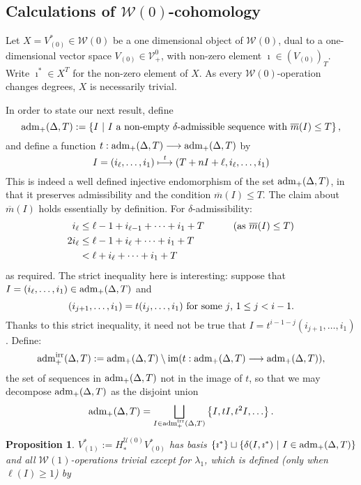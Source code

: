 \documentclass[11pt]{amsart}
\theoremstyle{plain}
\newtheorem{prop}[thm]{Proposition}
\theoremstyle{definition}
\DeclareMathOperator{\im}{im}
\renewcommand{\to}{\longrightarrow}
\newcommand{\calU}{\mathcal{U}}
\newcommand{\calV}{\mathcal{V}}
\newcommand{\calw}{\mathcal{W}}
\theoremstyle{plain}
\newcommand{\vect}[2]{\calV^{#1}_{#2}}
\newcommand{\minDimP}{\overline{m}}
\newcommand{\Sq}{\mathrm{Sq}}
\newcommand{\aDT}{\textup{adm}_+(\Delta,T)}
\newcommand{\aDTirr}{\textup{adm}_+^\textup{irr}(\Delta,T)}
\newcommand{\F}{\mathbb{F}}
\newcommand{\Ftwo}{\F_2}
\begin{document}
\begin{Calculations of HW0}


\section{\textbf{Calculations of ${\calw(0)}$-cohomology}}
Let $X=V^*_{(0)}\in\calw(0)$ be a one dimensional object of $\calw(0)$, dual to a one-dimensional vector space $V_{(0)}\in\vect{0}{+}$, with non-zero element $\imath\in(V_{(0)})_T$. Write $\imath^*\in X^T$ for the non-zero element of $X$. As every $\calw(0)$-operation changes degrees, $X$ is necessarily trivial.

In order to state our next result, define
\[\aDT:=\left\{I\ \middle|\ \textup{$I$ a non-empty $\delta$-admissible sequence with }\minDimP(I)\leq T\right\},\]
and define a function $t:\aDT\to \aDT$ by
\[I=(i_{\ell},\ldots,i_1)\overset{\smash{t}}{\longmapsto }(T+nI+\ell,i_\ell,\ldots,i_1)\]
This is indeed a well defined injective endomorphism of the set $\aDT$, in that it preserves admissibility and the condition $\minDimP(I)\leq T$. The claim about $\minDimP(I)$ holds essentially by definition. For $\delta$-admissibility:
\begin{alignat*}{2}
i_{\ell}
&\leq
\ell-1+i_{\ell-1}+\cdots +i_1+T&\qquad&\textup{(as $\minDimP(I)\leq T$)}%
\\
2i_{\ell}
&\leq
\ell-1+i_{\ell}+\cdots +i_1+T\\
&< \ell+i_{\ell}+\cdots +i_1+T%
\end{alignat*}
as required. The strict inequality here is interesting: suppose that $I=(i_\ell,\ldots,i_1)\in \aDT$ and 
\[(i_{j+1},\ldots,i_1)=t(i_{j},\ldots,i_1)\textup{ for some $j$, $1\leq j<i-1$.}\]
Thanks to this strict inequality, it need not be true that $I=t^{i-1-j}(i_{j+1},\ldots,i_1)$. %
Define:
\[\aDTirr:= \aDT\setminus\im(t:\aDT\to\aDT),\]
the set of sequences in $\aDT$ not in the image of $t$, so that we may decompose $\aDT$ as the disjoint union
\[\aDT=\bigsqcup_{\smash{I\in \aDTirr}}\left\{I,tI,t^2I,\ldots\right\}.\]
\begin{prop}
\label{calc of V1 from W0 sphere}
$V^*_{(1)}:=H_*^{\calU(0)}V^*_{(0)}$ has basis $\{\imath^*\}\sqcup\left\{\delta(I,\imath^*)\ \middle|\ I\in\aDT\right\}$ and all $\calw(1)$-operations trivial except for $\lambda_1$, which is defined (only when $\ell(I)\geq1$) by

\end{prop}
\end{Calculations of HW0}
\end{document}
